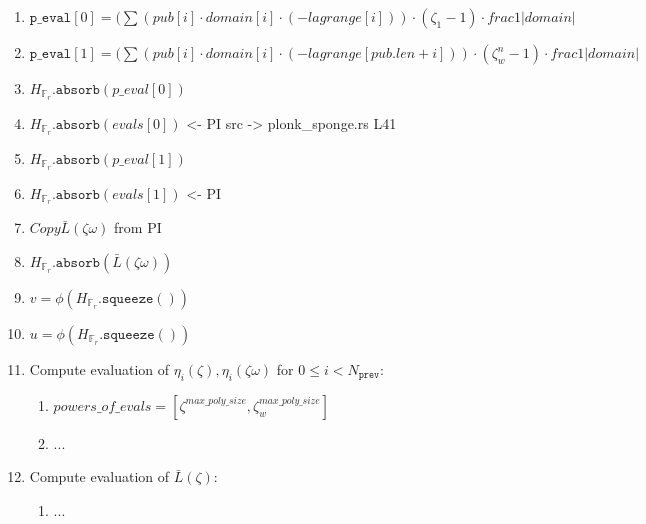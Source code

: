 \begin{algorithm}[H]
\begin{enumerate}
\begin{enumerate}
\begin{enumerate}
				\item $\texttt{p\_eval}[0] = (\sum(pub[i] \cdot domain[i] \cdot (-lagrange[i])) 
													\cdot (\zeta_1 - 1) \cdot frac{1}{|domain|}$
				\item $\texttt{p\_eval}[1] = (\sum(pub[i] \cdot domain[i] \cdot (-lagrange[pub.len + i])) 
													\cdot (\zeta_w^{n} - 1) \cdot frac{1}{|domain|}$
				\item $H_{\mathbb{F}_r}.\texttt{absorb}(p\_eval[0])$
				\item $H_{\mathbb{F}_r}.\texttt{absorb}(evals[0])$ <- PI src -> plonk\_sponge.rs L41
				\item $H_{\mathbb{F}_r}.\texttt{absorb}(p\_eval[1])$
				\item $H_{\mathbb{F}_r}.\texttt{absorb}(evals[1])$ <- PI
                \item $Copy \bar{L}(\zeta\omega)$ from PI
                \item $H_{\mathbb{F}_r}.\texttt{absorb}(\bar{L}(\zeta\omega))$
                \item $v = \phi(H_{\mathbb{F}_r}.\texttt{squeeze}())$
                \item $u = \phi(H_{\mathbb{F}_r}.\texttt{squeeze}())$
                \item Compute evaluation of $\eta_i(\zeta), \eta_i(\zeta\omega)$ for $0 \leq i < N_{\texttt{prev}}$:
                \begin{enumerate}
                	\item $powers\_of\_evals = [\zeta^{max\_poly\_size}, \zeta_w^{max\_poly\_size}]$
                	\item ...
                \end{enumerate}
                \item Compute evaluation of $\bar{L}(\zeta)$:
                \begin{enumerate}
                	\item ...
                \end{enumerate}
            \end{enumerate}

\end{enumerate}
\end{enumerate}
\end{algorithm}
